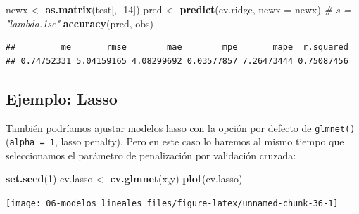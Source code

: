 \documentclass[
]{book}
\newenvironment{Shaded}{\begin{snugshade}}{\end{snugshade}}
\newcommand{\CommentTok}[1]{\textcolor[rgb]{0.56,0.35,0.01}{\textit{#1}}}
\newcommand{\DataTypeTok}[1]{\textcolor[rgb]{0.13,0.29,0.53}{#1}}
\newcommand{\DecValTok}[1]{\textcolor[rgb]{0.00,0.00,0.81}{#1}}
\newcommand{\FloatTok}[1]{\textcolor[rgb]{0.00,0.00,0.81}{#1}}
\newcommand{\KeywordTok}[1]{\textcolor[rgb]{0.13,0.29,0.53}{\textbf{#1}}}
\newcommand{\NormalTok}[1]{#1}
\newcommand{\OperatorTok}[1]{\textcolor[rgb]{0.81,0.36,0.00}{\textbf{#1}}}
\newcommand{\OtherTok}[1]{\textcolor[rgb]{0.56,0.35,0.01}{#1}}
\newcommand{\StringTok}[1]{\textcolor[rgb]{0.31,0.60,0.02}{#1}}
\theoremstyle{break}
\theoremstyle{definition}
\theoremstyle{definition}
\theoremstyle{definition}
\theoremstyle{remark}
\begin{document}
\begin{Shaded}
\begin{Highlighting}[]
\NormalTok{newx <-}\StringTok{ }\KeywordTok{as.matrix}\NormalTok{(test[, }\DecValTok{-14}\NormalTok{])}
\NormalTok{pred <-}\StringTok{ }\KeywordTok{predict}\NormalTok{(cv.ridge, }\DataTypeTok{newx =}\NormalTok{ newx) }\CommentTok{# s = "lambda.1se"}
\KeywordTok{accuracy}\NormalTok{(pred, obs)}
\end{Highlighting}
\end{Shaded}

\begin{verbatim}
##         me       rmse        mae        mpe       mape  r.squared 
## 0.74752331 5.04159165 4.08299692 0.03577857 7.26473444 0.75087456
\end{verbatim}

\hypertarget{ejemplo-lasso}{%
\subsection{Ejemplo: Lasso}\label{ejemplo-lasso}}

También podríamos ajustar modelos lasso con la opción por defecto de \texttt{glmnet()} (\texttt{alpha\ =\ 1}, lasso penalty).
Pero en este caso lo haremos al mismo tiempo que seleccionamos el parámetro de penalización por validación cruzada:

\begin{Shaded}
\begin{Highlighting}[]
\KeywordTok{set.seed}\NormalTok{(}\DecValTok{1}\NormalTok{)}
\NormalTok{cv.lasso <-}\StringTok{ }\KeywordTok{cv.glmnet}\NormalTok{(x,y)}
\KeywordTok{plot}\NormalTok{(cv.lasso)}
\end{Highlighting}
\end{Shaded}

\begin{center}\texttt{[image: 06-modelos\_lineales\_files/figure-latex/unnamed-chunk-36-1]} \end{center}

\begin{Shaded}
\end{Shaded}
\end{document}
